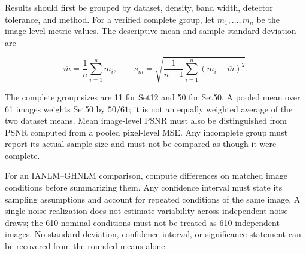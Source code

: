 \documentclass[pdflatex,iicol,sn-mathphys-num]{sn-jnl}
\newif\ifshowportuguese
\newcommand{\pt}[1]{\ifshowportuguese\par\begingroup\small\color{blue!55!black}\noindent\textbf{PT: }#1\par\endgroup\fi}
\begin{document}
Results should first be grouped by dataset, density, band width, detector tolerance, and method. For a verified complete group, let $m_1,\ldots,m_n$ be the image-level metric values. The descriptive mean and sample standard deviation are
\pt{Os resultados devem ser inicialmente agrupados por conjunto, densidade, largura de faixa, tolerância do detector e método. Para um grupo completo verificado, sejam $m_1,\ldots,m_n$ os valores da métrica por imagem. A média descritiva e o desvio padrão amostral são}
\begin{equation}
\overline{m}=\frac{1}{n}\sum_{i=1}^n m_i,\qquad
s_m=\sqrt{\frac{1}{n-1}\sum_{i=1}^n(m_i-\overline{m})^2}.
\label{eq:avg}
\end{equation}

The complete group sizes are 11 for Set12 and 50 for Set50. A pooled mean over 61 images weights Set50 by $50/61$; it is not an equally weighted average of the two dataset means. Mean image-level PSNR must also be distinguished from PSNR computed from a pooled pixel-level MSE. Any incomplete group must report its actual sample size and must not be compared as though it were complete.
\pt{Os tamanhos dos grupos completos são 11 para Set12 e 50 para Set50. Uma média agrupada sobre 61 imagens atribui peso $50/61$ ao Set50; ela não é uma média com pesos iguais entre os dois conjuntos. O PSNR médio por imagem também precisa ser distinguido do PSNR calculado a partir de um MSE agrupado por pixel. Qualquer grupo incompleto deve informar seu tamanho real e não pode ser comparado como se estivesse completo.}

For an IANLM--GHNLM comparison, compute differences on matched image conditions before summarizing them. Any confidence interval must state its sampling assumptions and account for repeated conditions of the same image. A single noise realization does not estimate variability across independent noise draws; the 610 nominal conditions must not be treated as 610 independent images. No standard deviation, confidence interval, or significance statement can be recovered from the rounded means alone.
\pt{Para comparar IANLM e GHNLM, calcular diferenças em condições correspondentes por imagem antes de resumi-las. Qualquer intervalo de confiança deve declarar suas hipóteses de amostragem e considerar as condições repetidas da mesma imagem. Uma única realização de ruído não estima a variabilidade entre sorteios independentes; as 610 condições nominais não podem ser tratadas como 610 imagens independentes. Nenhum desvio padrão, intervalo de confiança ou afirmação de significância pode ser recuperado apenas das médias arredondadas.}
\end{document}
